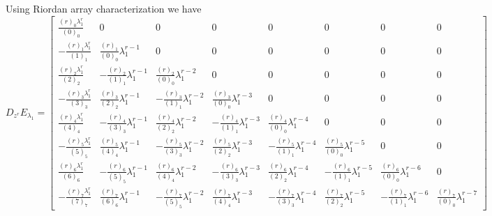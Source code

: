 Using Riordan array characterization we have 
\begin{displaymath}
D_{{z}^{r}}E_{\lambda_{1}} = \left[\begin{matrix}\frac{{\left(r\right)}_{0} \lambda_{1}^{r}}{{\left(0\right)}_{0}} & 0 & 0 & 0 & 0 & 0 & 0 & 0\\- \frac{{\left(r\right)}_{1} \lambda_{1}^{r}}{{\left(1\right)}_{1}} & \frac{{\left(r\right)}_{1}}{{\left(0\right)}_{0}} \lambda_{1}^{r - 1} & 0 & 0 & 0 & 0 & 0 & 0\\\frac{{\left(r\right)}_{2} \lambda_{1}^{r}}{{\left(2\right)}_{2}} & - \frac{{\left(r\right)}_{2}}{{\left(1\right)}_{1}} \lambda_{1}^{r - 1} & \frac{{\left(r\right)}_{2}}{{\left(0\right)}_{0}} \lambda_{1}^{r - 2} & 0 & 0 & 0 & 0 & 0\\- \frac{{\left(r\right)}_{3} \lambda_{1}^{r}}{{\left(3\right)}_{3}} & \frac{{\left(r\right)}_{3}}{{\left(2\right)}_{2}} \lambda_{1}^{r - 1} & - \frac{{\left(r\right)}_{3}}{{\left(1\right)}_{1}} \lambda_{1}^{r - 2} & \frac{{\left(r\right)}_{3}}{{\left(0\right)}_{0}} \lambda_{1}^{r - 3} & 0 & 0 & 0 & 0\\\frac{{\left(r\right)}_{4} \lambda_{1}^{r}}{{\left(4\right)}_{4}} & - \frac{{\left(r\right)}_{4}}{{\left(3\right)}_{3}} \lambda_{1}^{r - 1} & \frac{{\left(r\right)}_{4}}{{\left(2\right)}_{2}} \lambda_{1}^{r - 2} & - \frac{{\left(r\right)}_{4}}{{\left(1\right)}_{1}} \lambda_{1}^{r - 3} & \frac{{\left(r\right)}_{4}}{{\left(0\right)}_{0}} \lambda_{1}^{r - 4} & 0 & 0 & 0\\- \frac{{\left(r\right)}_{5} \lambda_{1}^{r}}{{\left(5\right)}_{5}} & \frac{{\left(r\right)}_{5}}{{\left(4\right)}_{4}} \lambda_{1}^{r - 1} & - \frac{{\left(r\right)}_{5}}{{\left(3\right)}_{3}} \lambda_{1}^{r - 2} & \frac{{\left(r\right)}_{5}}{{\left(2\right)}_{2}} \lambda_{1}^{r - 3} & - \frac{{\left(r\right)}_{5}}{{\left(1\right)}_{1}} \lambda_{1}^{r - 4} & \frac{{\left(r\right)}_{5}}{{\left(0\right)}_{0}} \lambda_{1}^{r - 5} & 0 & 0\\\frac{{\left(r\right)}_{6} \lambda_{1}^{r}}{{\left(6\right)}_{6}} & - \frac{{\left(r\right)}_{6}}{{\left(5\right)}_{5}} \lambda_{1}^{r - 1} & \frac{{\left(r\right)}_{6}}{{\left(4\right)}_{4}} \lambda_{1}^{r - 2} & - \frac{{\left(r\right)}_{6}}{{\left(3\right)}_{3}} \lambda_{1}^{r - 3} & \frac{{\left(r\right)}_{6}}{{\left(2\right)}_{2}} \lambda_{1}^{r - 4} & - \frac{{\left(r\right)}_{6}}{{\left(1\right)}_{1}} \lambda_{1}^{r - 5} & \frac{{\left(r\right)}_{6}}{{\left(0\right)}_{0}} \lambda_{1}^{r - 6} & 0\\- \frac{{\left(r\right)}_{7} \lambda_{1}^{r}}{{\left(7\right)}_{7}} & \frac{{\left(r\right)}_{7}}{{\left(6\right)}_{6}} \lambda_{1}^{r - 1} & - \frac{{\left(r\right)}_{7}}{{\left(5\right)}_{5}} \lambda_{1}^{r - 2} & \frac{{\left(r\right)}_{7}}{{\left(4\right)}_{4}} \lambda_{1}^{r - 3} & - \frac{{\left(r\right)}_{7}}{{\left(3\right)}_{3}} \lambda_{1}^{r - 4} & \frac{{\left(r\right)}_{7}}{{\left(2\right)}_{2}} \lambda_{1}^{r - 5} & - \frac{{\left(r\right)}_{7}}{{\left(1\right)}_{1}} \lambda_{1}^{r - 6} & \frac{{\left(r\right)}_{7}}{{\left(0\right)}_{0}} \lambda_{1}^{r - 7}\end{matrix}\right]
\end{displaymath}

